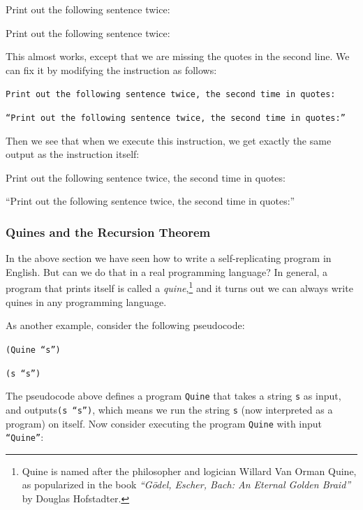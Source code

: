 \documentclass[11pt,fleqn]{article}
\begin{document}
\hspace{.3in}\textsf{Print out the following sentence twice:}

\hspace{.6in}\textsf{Print out the following sentence twice:}
 
This almost works, except that we are missing the quotes in the second line. We can fix it by modifying the instruction as follows:

\hspace{.3in}\texttt{Print out the following sentence twice, the second time in quotes:}

\hspace{.6in}\texttt{``Print out the following sentence twice, the second time in quotes:''}

Then we see that when we execute this instruction, we get exactly the same output as the instruction itself:

\hspace{.3in}\textsf{Print out the following sentence twice, the second time in quotes:}

\hspace{.6in}\textsf{``Print out the following sentence twice, the second time in quotes:''}



\subsubsection*{Quines and the Recursion Theorem}

In the above section we have seen how to write a self-replicating program in English. But can we do that in a real programming language? In general, a program that prints itself is called a {\em quine},\footnote{Quine is named after the philosopher and logician Willard Van Orman Quine, as popularized in the book {\em ``G\"odel, Escher, Bach: An Eternal Golden Braid''} by Douglas Hofstadter.} and it turns out we can always write quines in any programming language.

As another example, consider the following pseudocode:

\hspace{.3in}\texttt{(Quine ``s'')}

\hspace{.6in}\texttt{(s ``s'')}

The pseudocode above defines a program \texttt{Quine} that takes a string \texttt{s} as input, and outputs\texttt{(s ``s'')}, which means we run the string \texttt{s} (now interpreted as a program) on itself. Now consider executing the program \texttt{Quine} with input \texttt{``Quine''}:
\end{document}
